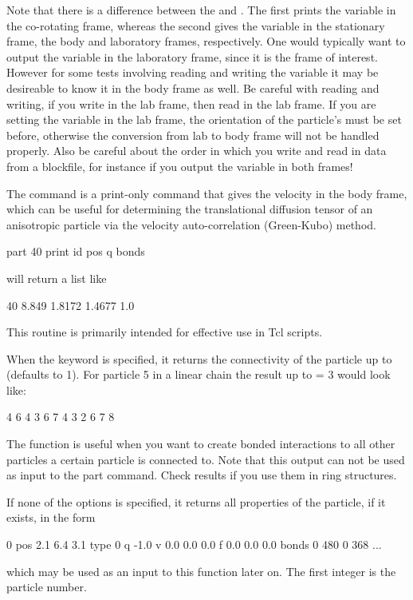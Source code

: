 Note that there is a difference between the  and
.  The first prints the variable in the co-rotating
frame, whereas the second gives the variable in the stationary frame,
the body and laboratory frames, respectively. One would typically want
to output the variable in the laboratory frame, since it is the frame
of interest. However for some tests involving reading and writing the
variable it may be desireable to know it in the body frame as well. Be
careful with reading and writing, if you write in the lab frame, then
read in the lab frame. If you are setting the variable in the lab
frame, the orientation of the particle's  must be set
before, otherwise the conversion from lab to body frame will not be
handled properly.  Also be careful about the order in which you write
and read in data from a blockfile, for instance if you output the
variable in both frames!

The  command is a print-only command that
gives the velocity in the body frame, which can be useful for 
determining the translational diffusion tensor of an anisotropic 
particle via the velocity auto-correlation (Green-Kubo) method.

\begin{code}
part 40 print id pos q bonds
\end{code}
will return a list like
\begin{tclcode}
40 8.849 1.8172 1.4677 1.0 {}
\end{tclcode}
This routine is primarily intended for effective use in Tcl scripts.

When the keyword  is specified, it returns the
connectivity of the particle up to  (defaults to 1). For
particle 5 in a linear chain the result up to  = 3 would
look like:
\begin{tclcode}
{ { 4 } { 6 } } { { 4 3 } { 6 7 } } { {4 3 2 } { 6 7 8 } } 
\end{tclcode}
The function is useful when you want to create bonded interactions to
all other particles a certain particle is connected to. Note that this
output can not be used as input to the part command. Check results if
you use them in ring structures.

If none of the options is specified, it returns all properties of the
particle, if it exists, in the form
\begin{tclcode}
  0 pos 2.1 6.4 3.1 type 0 q -1.0 v 0.0 0.0 0.0 f 0.0 0.0 0.0
  bonds { {0 480} {0 368} ... } 
\end{tclcode}
which may be used as an input to this function later on. The first
integer is the particle number.

